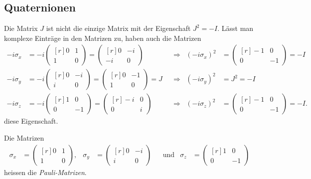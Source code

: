 %
%
%
\subsection{Quaternionen}
Die Matrix $J$ ist nicht die einzige Matrix mit der Eigenschaft
$J^2=-I$.
%
Lässt man komplexe Einträge in den Matrizen zu, haben auch die
Matrizen
\begin{align*}
-i\sigma_x
&=
-i
\begin{pmatrix*}[r]
0&1\\
1&0
\end{pmatrix*}
=
\begin{pmatrix*}[r]
 0&-i\\
-i& 0
\end{pmatrix*}
&&\Rightarrow&
(-i\sigma_x)^2
&=
\begin{pmatrix*}[r]
-1& 0\\
 0&-1
\end{pmatrix*}
=
-I
\\
-i\sigma_y
&=
-i
\begin{pmatrix*}[r]
0&-i\\
i& 0
\end{pmatrix*}
=
\begin{pmatrix*}[r]
0&-1\\
1&0
\end{pmatrix*}
=
J
&&\Rightarrow&
(-i\sigma_y)^2
&=
J^2
=
-I
\\
-i\sigma_z
&=
-i
\begin{pmatrix*}[r]
1&0\\
0&-1
\end{pmatrix*}
=
\begin{pmatrix*}[r]
-i&0\\
 0&i
\end{pmatrix*}
&&\Rightarrow&
(-i\sigma_z)^2
&=
\begin{pmatrix*}[r]
-1& 0\\
 0&-1
\end{pmatrix*}
=
-I.
\end{align*}
diese Eigenschaft.

\begin{definition}
Die Matrizen
\begin{align*}
\sigma_x
&=
\begin{pmatrix*}[r]
0&1\\
1&0
\end{pmatrix*},
&
\sigma_y
&=
\begin{pmatrix*}[r]
0&-i\\
i& 0
\end{pmatrix*}
&&\text{und}
&
\sigma_z
&=
\begin{pmatrix*}[r]
1&0\\
0&-1
\end{pmatrix*}
\end{align*}
heissen die \emph{Pauli-Matrizen}.
%
\end{definition}


